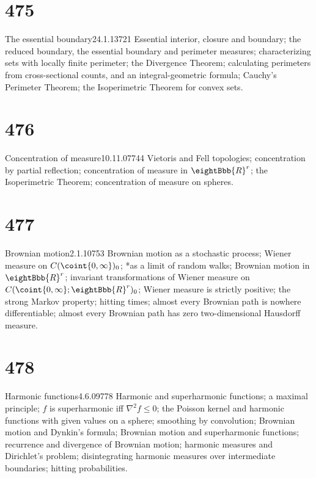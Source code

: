 \ifdim\pagewidth>467pt\fontdimen3\tenrm=2pt\fi

\section{475}{The essential boundary}{24.1.13}{721}{}
{Essential interior, closure and boundary;  the reduced boundary, the
essential boundary and perimeter measures;  
characterizing sets with locally finite perimeter;
the Divergence Theorem;   calculating perimeters from cross-sectional
counts, and an integral-geometric formula;  
Cauchy's Perimeter Theorem;  the Isoperimetric Theorem for
convex sets.}

\tenrm=1.67pt

\section{476}{Concentration of measure}{10.11.07}{744}{}
{Vietoris and Fell topologies;  concentration by partial
reflection;  concentration of measure in $\eightBbb{R}^r$;
the Isoperimetric
Theorem;  concentration of measure on spheres.}

\section{477}{Brownian motion}{2.1.10}{753}{}
{Brownian motion as a stochastic process;  Wiener measure on
$C(\coint{0,\infty})_0$;  *as a limit of random walks;
Brownian motion in $\eightBbb{R}^r$;   invariant
transformations of Wiener measure on
$C(\coint{0,\infty};\eightBbb{R}^r)_0$;  Wiener measure is strictly
positive;  the strong Markov property;  hitting times;  almost every
Brownian path is nowhere differentiable;  almost every Brownian path has
zero two-dimensional Hausdorff measure.}

\section{478}{Harmonic functions}{4.6.09}{778}{}
{Harmonic and superharmonic functions;  a maximal principle;  $f$ is
superharmonic iff $\nabla^2f\le0$;  the Poisson kernel and
harmonic functions
with given values on a sphere;  smoothing by convolution;  Brownian motion
and Dynkin's formula;  Brownian motion and superharmonic functions;
recurrence and divergence of Brownian motion;
harmonic measures and Dirichlet's problem;  disintegrating harmonic
measures over intermediate boundaries;  hitting probabilities.}

